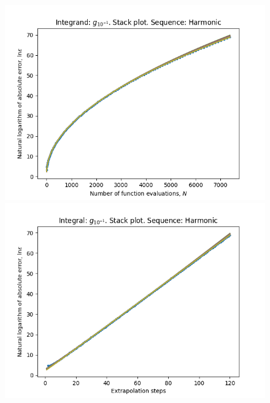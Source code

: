 \begin{figure}[H]
\centering
\begin{minipage}{0.45\textwidth}
\centering
\includegraphics[scale=0.45]{../results/romberg_plots/g_tenth_hp_harmonic_stack.png}
\end{minipage}
\begin{minipage}{0.45\textwidth}
\centering
\includegraphics[scale=0.45]{../results/romberg_plots/g_tenth_hp_harmonic_steps_stack.png}
\end{minipage}
\end{figure}

